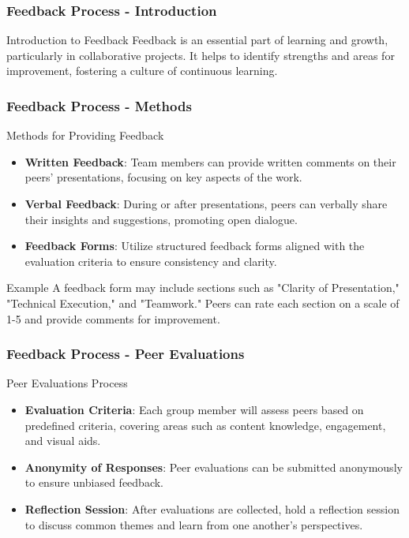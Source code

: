 \documentclass[aspectratio=169]{beamer}
\begin{document}
\begin{frame}[fragile]
    \frametitle{Feedback Process - Introduction}
    \begin{block}{Introduction to Feedback}
        Feedback is an essential part of learning and growth, particularly in collaborative projects. 
        It helps to identify strengths and areas for improvement, fostering a culture of continuous learning.
    \end{block}
\end{frame}

\begin{frame}[fragile]
    \frametitle{Feedback Process - Methods}
    \begin{block}{Methods for Providing Feedback}
        \begin{itemize}
            \item \textbf{Written Feedback}: Team members can provide written comments on their peers’ presentations, focusing on key aspects of the work.
            \item \textbf{Verbal Feedback}: During or after presentations, peers can verbally share their insights and suggestions, promoting open dialogue.
            \item \textbf{Feedback Forms}: Utilize structured feedback forms aligned with the evaluation criteria to ensure consistency and clarity.
        \end{itemize}
        \begin{block}{Example}
            A feedback form may include sections such as "Clarity of Presentation," "Technical Execution," and "Teamwork." 
            Peers can rate each section on a scale of 1-5 and provide comments for improvement.
        \end{block}
    \end{block}
\end{frame}

\begin{frame}[fragile]
    \frametitle{Feedback Process - Peer Evaluations}
    \begin{block}{Peer Evaluations Process}
        \begin{itemize}
            \item \textbf{Evaluation Criteria}: Each group member will assess peers based on predefined criteria, covering areas such as content knowledge, engagement, and visual aids.
            \item \textbf{Anonymity of Responses}: Peer evaluations can be submitted anonymously to ensure unbiased feedback.
            \item \textbf{Reflection Session}: After evaluations are collected, hold a reflection session to discuss common themes and learn from one another’s perspectives.
        \end{itemize}
    \end{block}
\end{frame}
\end{document}
